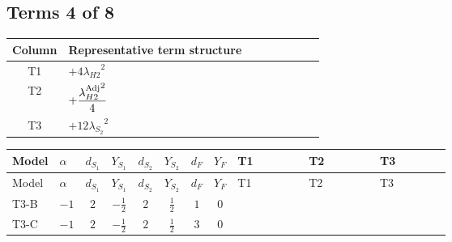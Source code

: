 \documentclass[8pt]{article}
\begin{document}
\begin{landscape}
\subsection*{Terms 4 of 8}
\begin{center}
\begin{tabular}{@{}c >{\raggedright\arraybackslash}p{0.82\linewidth}@{}}
\toprule
Column & Representative term structure \\
\midrule
T1 & \(\displaystyle +4 {\lambda_{H2}}^2\) \\
\midrule
T2 & \(\displaystyle +\frac{{\lambda_{H2}^{\rm Adj}}^2}{4}\) \\
\midrule
T3 & \(\displaystyle +12 {\lambda_{S_2}}^2\) \\
\midrule
\bottomrule
\end{tabular}
\end{center}
\smallskip
\tiny
\begin{longtable}{@{}llcccccc >{\raggedright\arraybackslash}p{0.21\linewidth} >{\raggedright\arraybackslash}p{0.21\linewidth} >{\raggedright\arraybackslash}p{0.21\linewidth}@{}}
\toprule
Model & $\alpha$ & $d_{S_1}$ & $Y_{S_1}$ & $d_{S_2}$ & $Y_{S_2}$ & $d_F$ & $Y_F$ & T1 & T2 & T3 \\
\midrule
\endfirsthead
\toprule
Model & $\alpha$ & $d_{S_1}$ & $Y_{S_1}$ & $d_{S_2}$ & $Y_{S_2}$ & $d_F$ & $Y_F$ & T1 & T2 & T3 \\
\midrule
\endhead
T3-B & $-1$ & $2$ & $-\frac{1}{2}$ & $2$ & $\frac{1}{2}$ & $1$ & $0$ & \scriptsize\adjustbox{max width=\linewidth}{$\begin{gathered} +4 {\lambda_{H2}}^2\end{gathered}$} & \scriptsize\adjustbox{max width=\linewidth}{$\begin{gathered} +\frac{{\lambda_{H2}^{\rm Adj}}^2}{4}\end{gathered}$} & \scriptsize\adjustbox{max width=\linewidth}{$\begin{gathered} +12 {\lambda_{S_2}}^2\end{gathered}$} \\
\midrule
T3-C & $-1$ & $2$ & $-\frac{1}{2}$ & $2$ & $\frac{1}{2}$ & $3$ & $0$ & \scriptsize\adjustbox{max width=\linewidth}{$\begin{gathered} +4 {\lambda_{H2}}^2\end{gathered}$} & \scriptsize\adjustbox{max width=\linewidth}{$\begin{gathered} +\frac{{\lambda_{H2}^{\rm Adj}}^2}{4}\end{gathered}$} & \scriptsize\adjustbox{max width=\linewidth}{$\begin{gathered} +12 {\lambda_{S_2}}^2\end{gathered}$} \\

\end{longtable}
\end{landscape}
\end{document}

